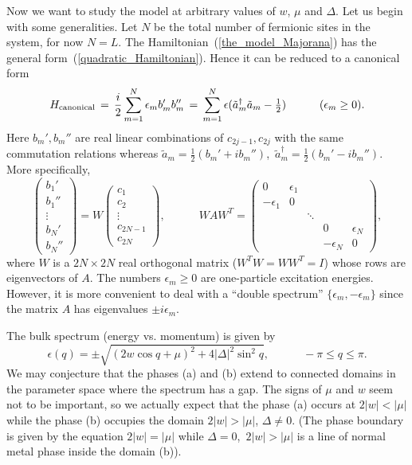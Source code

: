 Now we want to study the model at arbitrary values of $w$, $\mu$ and $\Delta$.
Let us begin with some generalities. Let $N$ be the total number
of fermionic sites in the system, for now $N=L$. The
Hamiltonian~(\ref{the_model_Majorana}) has the general
form~(\ref{quadratic_Hamiltonian}). Hence it can be reduced to a canonical
form
\begin{equation}\label{canonical_form}
H_{\rm canonical} \,=\,\frac{i}{2}\sum_{m=1}^{N}\epsilon_m b_m'b_m'' \,=\,
\sum_{m=1}^{N}\epsilon(\tilde a_m^\dagger\tilde a_m-{\textstyle\frac{1}{2}})
\qquad\quad (\epsilon_m\ge 0).
\end{equation}
Here $b_m',b_m''$ are real linear combinations of $c_{2j-1},c_{2j}$ with the
same commutation relations whereas $\tilde a_m=\frac{1}{2}(b_m'+ib_m'')$,\,
$\tilde a_m^\dagger=\frac{1}{2}(b_m'-ib_m'')$. More specifically,
\begin{equation}\label{reduction_to_canonical}
\left(\begin{array}{c} b_1'\\ b_1''\\ \vdots\\ b_N'\\ b_N''\end{array}\right)
= W \left(\begin{array}{c}
  c_1\\ c_2\\ \vdots\\ c_{2N-1}\\ c_{2N}\end{array}\right),
\qquad\quad
WAW^T = \left(\begin{array}{ccccc}
  0 & \epsilon_1 &&&\\ -\epsilon_1 & 0 &&&\\ &&\ddots&&\\
  &&& 0 & \epsilon_N\\ &&& -\epsilon_N & 0 \end{array}\right),
\end{equation}
where $W$ is a $2N\times 2N$ real orthogonal matrix ($W^TW=WW^T=I$) whose rows
are eigenvectors of $A$. The numbers $\epsilon_m\ge 0$ are one-particle
excitation energies. However, it is more convenient to deal with a ``double
spectrum'' $\{\epsilon_m,-\epsilon_m\}$ since the matrix $A$ has eigenvalues
$\pm i\epsilon_m$.

The bulk spectrum (energy vs. momentum) is given by
\begin{equation}
\epsilon(q)=\pm\sqrt{(2w\cos q+\mu)^2+4|\Delta|^2\sin^2q}, \qquad\quad
-\pi\le q\le \pi.
\end{equation}
We may conjecture that the phases (a) and (b) extend to connected domains in
the parameter space where the spectrum has a gap. The signs of $\mu$ and $w$
seem not to be important, so we actually expect that the phase (a) occurs at
$2|w|<|\mu|$ while the phase (b) occupies the domain $2|w|>|\mu|$,
$\Delta\not=0$. (The phase boundary is given by the equation $2|w|=|\mu|$
while $\Delta=0$,\, $2|w|>|\mu|$ is a line of normal metal phase inside the
domain (b)).

